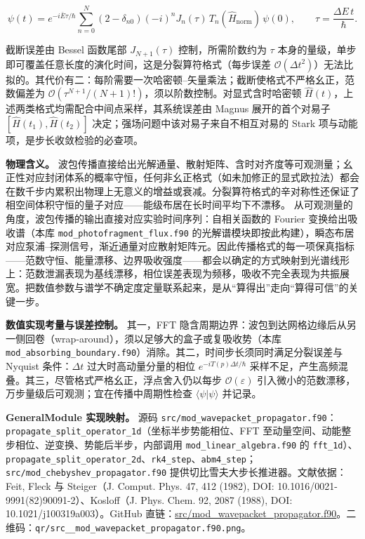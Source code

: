 \documentclass[
]{ctexbook}
\begin{document}
\[\psi(t)=e^{-i\bar{E}\tau/\hbar}\sum_{n=0}^{N}\left(2-\delta_{n0}\right)(-i)^{n}J_{n}(\tau)\,T_{n}(\hat{H}_{\mathrm{norm}})\,\psi(0),\qquad \tau=\frac{\Delta E\,t}{\hbar}.\]

截断误差由 Bessel 函数尾部 \(J_{N+1}(\tau)\) 控制，所需阶数约为 \(\tau\)
本身的量级，单步即可覆盖任意长度的演化时间，这是分裂算符格式（每步误差
\(\mathcal{O}(\Delta t^{2})\)）无法比拟的。其代价有二：每阶需要一次哈密顿--矢量乘法；截断使格式不严格幺正，范数偏差为
\(\mathcal{O}(\tau^{N+1}/(N+1)!)\)，须以阶数控制。对显式含时哈密顿
\(\hat{H}(t)\)，上述两类格式均需配合中间点采样，其系统误差由 Magnus
展开的首个对易子 \([\hat{H}(t_1),\hat{H}(t_2)]\)
决定；强场问题中该对易子来自不相互对易的 Stark
项与动能项，是步长收敛检验的必查项。

\textbf{物理含义。}
波包传播直接给出光解通量、散射矩阵、含时对齐度等可观测量；幺正性对应封闭体系的概率守恒，任何非幺正格式（如未加修正的显式欧拉法）都会在数千步内累积出物理上无意义的增益或衰减。分裂算符格式的辛对称性还保证了相空间体积守恒的量子对应------能级布居在长时间平均下不漂移。
从可观测量的角度，波包传播的输出直接对应实验时间序列：自相关函数的
Fourier 变换给出吸收谱（本库 \texttt{mod\_photofragment\_flux.f90}
的光解谱模块即按此构建），瞬态布居对应泵浦--探测信号，渐近通量对应散射矩阵元。因此传播格式的每一项保真指标------范数守恒、能量漂移、边界吸收强度------都会以确定的方式映射到光谱线形上：范数泄漏表现为基线漂移，相位误差表现为频移，吸收不完全表现为共振展宽。把数值参数与谱学不确定度定量联系起来，是从``算得出''走向``算得可信''的关键一步。

\textbf{数值实现考量与误差控制。} 其一，FFT
隐含周期边界：波包到达网格边缘后从另一侧回卷（wrap-around），须以足够大的盒子或复吸收势（本库
\texttt{mod\_absorbing\_boundary.f90}）消除。其二，时间步长须同时满足分裂误差与Nyquist
条件：\(\Delta t\) 过大时高动量分量的相位 \(e^{-iT(p)\Delta t/\hbar}\)
采样不足，产生高频混叠。其三，尽管格式严格幺正，浮点舍入仍以每步
\(\mathcal{O}(\varepsilon)\)
引入微小的范数漂移，万步量级后可观测；宜在传播中周期性检查
\(\langle\psi|\psi\rangle\) 并记录。

\textbf{GeneralModule 实现映射。} 源码
\texttt{src/mod\_wavepacket\_propagator.f90}：\texttt{propagate\_split\_operator\_1d}（坐标半步势能相位、FFT
至动量空间、动能整步相位、逆变换、势能后半步，内部调用
\texttt{mod\_linear\_algebra.f90} 的
\texttt{fft\_1d}）、\texttt{propagate\_split\_operator\_2d}、\texttt{rk4\_step}、\texttt{abm4\_step}；\texttt{src/mod\_chebyshev\_propagator.f90}
提供切比雪夫大步长推进器。文献依据：Feit, Fleck 与 Steiger（J. Comput.
Phys. 47, 412 (1982), DOI: 10.1016/0021-9991(82)90091-2）、Kosloff（J.
Phys. Chem. 92, 2087 (1988), DOI: 10.1021/j100319a003）。GitHub
直链：\href{https://github.com/l1Ha/QuantumGeneralModule/blob/main/src/mod_wavepacket_propagator.f90}{src/mod\_wavepacket\_propagator.f90}。二维码：\texttt{qr/src\_\_mod\_wavepacket\_propagator.f90.png}。
\end{document}
